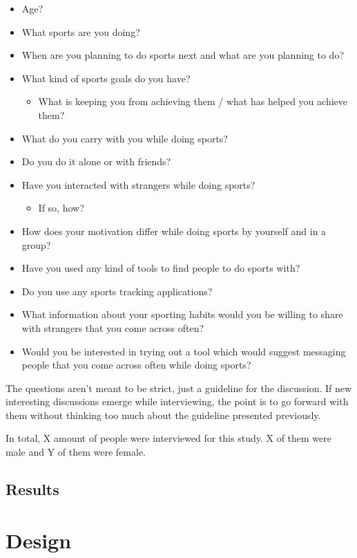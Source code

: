 \begin{itemize}
	\item Age?
	\item What sports are you doing?
	\item When are you planning to do sports next and what are you planning to do?
	\item What kind of sports goals do you have?
		\begin{itemize}
			\item What is keeping you from achieving them / what has helped you achieve them?
		\end{itemize}
	\item What do you carry with you while doing sports?
	\item Do you do it alone or with friends?
	\item Have you interacted with strangers while doing sports?
		\begin{itemize}
			\item If so, how?
		\end{itemize}
	\item How does your motivation differ while doing sports by yourself and in a group?
	\item Have you used any kind of tools to find people to do sports with?
	\item Do you use any sports tracking applications?
	\item What information about your sporting habits would you be willing to share with strangers that you come across often?
	\item Would you be interested in trying out a tool which would suggest messaging people that you come across often while doing sports?
\end{itemize}

The questions aren't meant to be strict, just a guideline for the discussion. If new interesting discussions emerge while interviewing, the point is to go forward with them without thinking too much about the guideline presented previously.

In total, X amount of people were interviewed for this study. X of them were male and Y of them were female.

\subsection{Results}

\section{Design}

